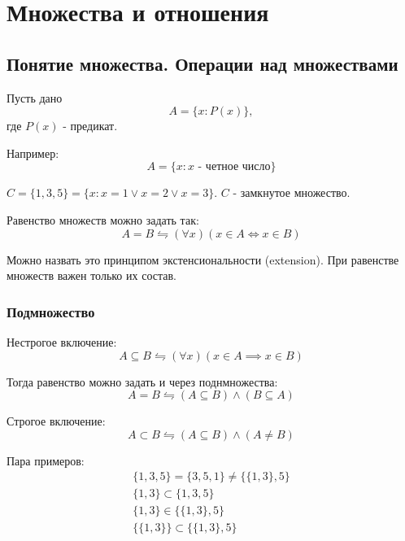 

\title{}
\author{Козырнов Александр Дмитриевич, ИУ7-32Б}
\date{\today}


\chapter{Множества и отношения}
\section{Понятие множества. Операции над множествами}

Пусть дано $$A = \{x: P(x)\},$$ где $P(x)$ - предикат.

\medskip

Например:  \[
	A = \{x: x \text{ - четное число}\} 
\] 

$C = \{1,3,5\} = \{x:x=1 \lor x=2 \lor x=3\}$. $C$ - замкнутое множество.

\medskip

\begin{definition}
Равенство множеств можно задать так:
\[
A = B \leftrightharpoons (\forall x)(x \in A \Longleftrightarrow x \in B)
\] 
\end{definition}
Можно назвать это принципом экстенсиональности (extension).
При равенстве множеств важен только их состав.

\subsection{Подмножество}
\begin{definition}
Нестрогое включение:
$$A \subseteq B \leftrightharpoons (\forall x)(x \in A \implies x \in B)$$
\end{definition}

\medskip

Тогда равенство можно задать и через поднмножества:
\[
A = B \leftrightharpoons (A \subseteq B) \land (B \subseteq A)
\] 
\begin{definition}
Строгое включение: \[
A \subset B \leftrightharpoons (A\subseteq B) \land (A \neq B)
\] 
\end{definition}

Пара примеров:
\begin{gather*}
\{1,3,5\} = \{3,5,1\}  \neq \{\{1,3\},5 \} \\
\{1,3\} \subset \{1,3,5\} \\
\{1,3\} \in \{\{1,3\},5 \} \\
\{\{1,3\} \} \subset \{\{1,3\},5 \}  
\end{gather*}

